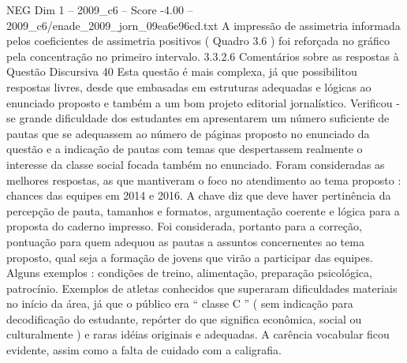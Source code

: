 \begin{textsample}{NEG Dim 1 – 2009\_c6 – Score -4.00 – 2009\_c6/enade\_2009\_jorn\_09ea6e96cd.txt}
A impressão de assimetria informada pelos coeficientes de assimetria positivos ( Quadro 3.6 ) foi reforçada no gráfico pela concentração no primeiro intervalo. 3.3.2.6 Comentários sobre as respostas à Questão Discursiva 40 Esta questão é mais complexa, já que possibilitou respostas livres, desde que embasadas em estruturas adequadas e lógicas ao enunciado proposto e também a um bom projeto editorial jornalístico.
Verificou -se grande dificuldade dos estudantes em apresentarem um número suficiente de pautas que se adequassem ao número de páginas proposto no enunciado da questão e a indicação de pautas com temas que despertassem realmente o interesse da classe social focada também no enunciado.
Foram consideradas as melhores respostas, as que mantiveram o foco no atendimento ao tema proposto : chances das equipes em 2014 e 2016.
A chave diz que deve haver pertinência da percepção de pauta, tamanhos e formatos, argumentação coerente e lógica para a proposta do caderno impresso.
Foi considerada, portanto para a correção, pontuação para quem adequou as pautas a assuntos concernentes ao tema proposto, qual seja a formação de jovens que virão a participar das equipes.
Alguns exemplos : condições de treino, alimentação, preparação psicológica, patrocínio.
Exemplos de atletas conhecidos que superaram dificuldades materiais no início da área, já que o público era “ classe C ” ( sem indicação para decodificação do estudante, repórter do que significa econômica, social ou culturalmente ) e raras idéias originais e adequadas.
A carência vocabular ficou evidente, assim como a falta de cuidado com a caligrafia.

\end{textsample}
